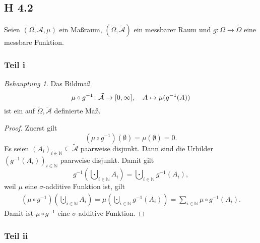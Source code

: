 \documentclass[draft,a5paper]{article}
\theoremstyle{remark}
\newtheorem*{Behauptung}{Behauptung}
\newcommand{\wt}{\widetilde}
\begin{document}
\subsection{H 4.2}
Seien \((\Omega, \mathcal{A}, \mu)\) ein Maßraum, \((\wt{\Omega}, \wt{\mathcal{A}})\) ein messbarer Raum
und \(g\colon \Omega \to \wt{\Omega}\) eine messbare Funktion.

\subsubsection{Teil i}

\begin{Behauptung}
  Das Bildmaß
  \[\mu \circ g^{-1}\colon \wt{\mathcal{A}} \to \interval{0}{\infty}, \quad A \mapsto \mu(g^{-1}(A)) \]
  ist ein auf \(\wt{\Omega}, \wt{\mathcal{A}}\) definierte Maß.
\end{Behauptung}
\begin{proof}
  Zuerst gilt
  \[(\mu \circ g^{-1})(\emptyset) = \mu(\emptyset) = 0.\]
  Es seien \((A_{i})_{i\in \mathbb{N}} \subseteq \wt{\mathcal{A}}\)  paarweise disjunkt.  Dann sind
  die Urbilder \((g^{-1}(A_{i}))_{i \in \mathbb{N}}\) paarweise disjunkt.  Damit
  gilt
  \[g^{-1}(\bigcupdot_{i \in \mathbb{N}}{A_{i}}) = \bigcupdot_{i \in
      \mathbb{N}}{g^{-1}(A_{i})},\] weil \(\mu\) eine \(\sigma\)-additive Funktion ist,
  gilt
  \begin{align*}
    (\mu \circ g^{-1})(\bigcupdot_{i \in \mathbb{N}}{A_{i}}) = \mu(\bigcupdot_{i \in
    \mathbb{N}} g^{-1}({A_{i}})) = \sum_{i \in \mathbb{N}}{\mu \circ g^{-1} (A_{i})}.
  \end{align*}
  Damit ist \(\mu \circ g^{-1}\) eine \(\sigma\)-additive Funktion.
\end{proof}

\subsubsection{Teil ii}
\end{document}
